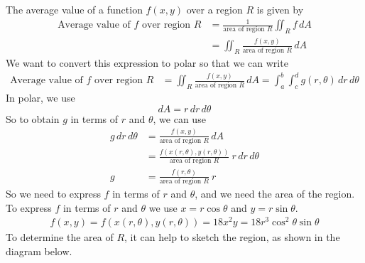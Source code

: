     {\color{DarkBlue} 
    The average value of a function $f(x,y)$ over a region $R$ is given by 
    \begin{align}
        \text{Average value of }f\text{ over region }R 
        &= \frac{1}{\text{area of region }R}\iint_R f \, dA \\
        &= \iint_R \frac{f(x,y)}{\text{area of region }R} \, dA
    \end{align}
    We want to convert this expression to polar so that we can write
        \begin{align}
        \text{Average value of }f\text{ over region }R 
        &= \iint_R \frac{f(x,y)}{\text{area of region }R} \, dA 
        = \int_a^b \int_c^d g(r,\theta) \, dr \, d\theta
    \end{align}
    In polar, we use $$dA = r \, dr \, d\theta$$ So to obtain $g$ in terms of $r$ and $\theta$, we can use
    \begin{align}
         g \, dr \, d\theta &= \frac{f(x,y)}{\text{area of region }R}  \, dA \\
         &= \frac{f(x(r,\theta),y(r,\theta))}{\text{area of region }R} \ r \, dr \, d\theta  \\ 
        g &= \frac{f(r,\theta)}{\text{area of region }R} \ r
    \end{align}
    So we need to express $f$ in terms of $r$ and $\theta$, and we need the area of the region. To express $f$ in terms of $r$ and $\theta$ we use $x=r\cos\theta$ and $y=r\sin\theta$. 
    \begin{align}
        f(x,y) = f(x(r,\theta),y(r,\theta)) = 18x^2y = 18r^3\cos^2\theta \sin\theta
    \end{align}
    To determine the area of $R$, it can help to sketch the region, as shown in the diagram below. 
    \begin{center}     
\end{center}}

